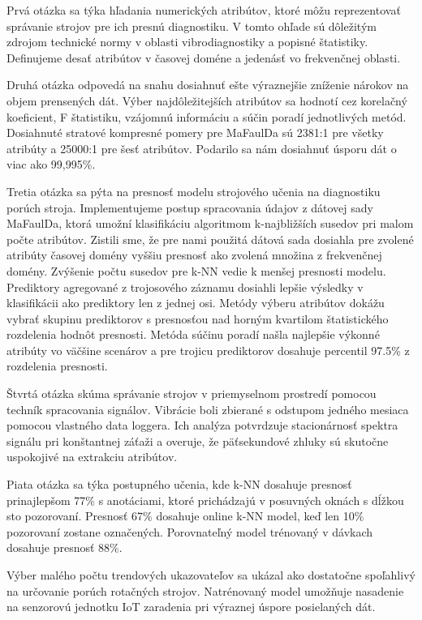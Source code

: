 Prvá otázka sa týka hľadania numerických atribútov, ktoré môžu reprezentovať správanie strojov pre ich presnú diagnostiku. V tomto ohľade sú dôležitým zdrojom technické normy v oblasti vibrodiagnostiky a popisné štatistiky. Definujeme desať atribútov v časovej doméne a jedenásť vo frekvenčnej oblasti.

Druhá otázka odpovedá na snahu dosiahnuť ešte výraznejšie zníženie nárokov na objem prensených dát. Výber najdôležitejších atribútov sa hodnotí cez korelačný koeficient, F štatistiku, vzájomnú informáciu a súčin poradí jednotlivých metód. Dosiahnuté stratové kompresné pomery pre MaFaulDa sú 2381:1 pre všetky atribúty a 25000:1 pre šesť atribútov. Podarilo sa nám dosiahnuť úsporu dát o viac ako 99,995\%.

Tretia otázka sa pýta na presnosť modelu strojového učenia na diagnostiku porúch stroja. Implementujeme postup spracovania údajov z dátovej sady MaFaulDa, ktorá umožní klasifikáciu algoritmom k-najbližších susedov pri malom počte atribútov.  Zistili sme, že pre nami použitá dátová sada dosiahla pre zvolené atribúty časovej domény vyššiu presnosť ako zvolená množina z frekvenčnej domény. Zvýšenie počtu susedov pre k-NN vedie k menšej presnosti modelu. Prediktory agregované z trojosového záznamu dosiahli lepšie výsledky v klasifikácii ako prediktory len z jednej osi. Metódy výberu atribútov dokážu vybrať skupinu prediktorov s presnosťou nad horným kvartilom štatistického rozdelenia hodnôt presnosti. Metóda súčinu poradí našla najlepšie výkonné atribúty vo väčšine scenárov a pre trojicu prediktorov dosahuje percentil 97.5\% z rozdelenia presnosti.

Štvrtá otázka skúma správanie strojov v priemyselnom prostredí pomocou techník spracovania signálov. Vibrácie boli zbierané s odstupom jedného mesiaca pomocou vlastného data loggera. Ich analýza potvrdzuje stacionárnosť spektra signálu pri konštantnej záťaži a overuje, že päťsekundové zhluky sú skutočne uspokojivé na extrakciu atribútov.

Piata otázka sa týka postupného učenia, kde k-NN dosahuje presnosť prinajlepšom 77\% s anotáciami, ktoré prichádzajú v posuvných oknách s dĺžkou sto pozorovaní. Presnosť 67\% dosahuje online k-NN model, keď len 10\% pozorovaní zostane označených. Porovnateľný model trénovaný v dávkach dosahuje presnosť 88\%.

Výber malého počtu trendových ukazovateľov sa ukázal ako dostatočne spoľahlivý na určovanie porúch rotačných strojov. Natrénovaný model umožňuje nasadenie na senzorovú jednotku IoT zaradenia pri výraznej úspore posielaných dát.
\clearpage